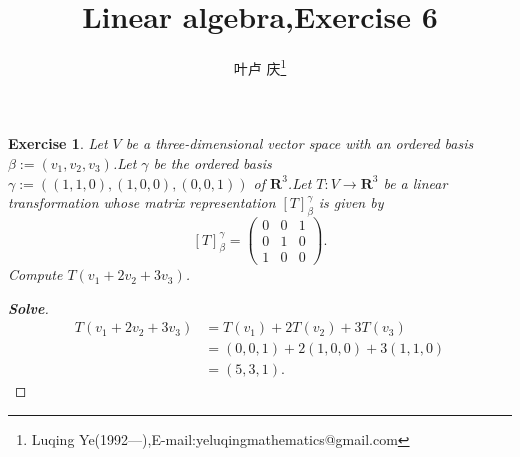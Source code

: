 \documentclass[a4paper]{article}
\newtheorem*{exe}{Exercise}
\newenvironment{exercise}
{\bigskip\begin{mdframed}\begin{exe}}
    {\end{exe}\end{mdframed}\bigskip}
\begin{document}
\title{\huge{\bf{Linear algebra,Exercise 6}}} \author{\small{叶卢
    庆\footnote{Luqing
      Ye(1992---),E-mail:yeluqingmathematics@gmail.com}}}
\maketitle
\begin{exercise}
  Let $V$ be a three-dimensional vector space with an ordered basis
  $\beta:=(v_1,v_2,v_3)$.Let $\gamma$ be the ordered basis
  $\gamma:=((1,1,0),(1,0,0),(0,0,1))$ of $\mathbf{R}^3$.Let $T:V\to
  \mathbf{R}^3$ be a linear transformation whose matrix representation
  $[T]_{\beta}^{\gamma}$ is given by 
$$
[T]_{\beta}^{\gamma}=\begin{pmatrix}
  0&0&1\\
0&1&0\\
1&0&0
\end{pmatrix}.
$$
Compute $T(v_1+2v_2+3v_3)$.
\end{exercise}
\begin{proof}[\textbf{Solve}]
  \begin{align*}
    T(v_1+2v_2+3v_3)&=T(v_1)+2T(v_2)+3T(v_3)
\\&=(0,0,1)+2(1,0,0)+3(1,1,0)
\\&=(5,3,1).
  \end{align*}
\end{proof}
\end{document}
